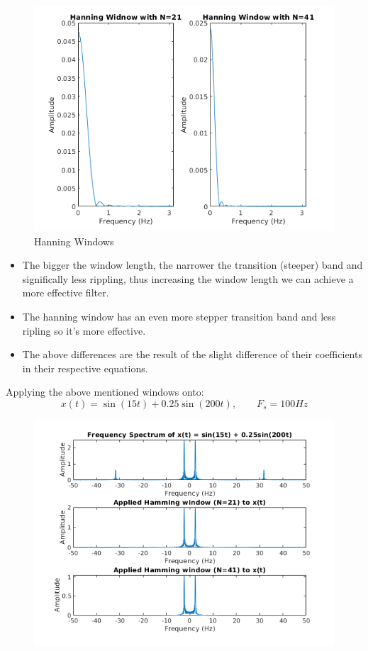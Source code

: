 \documentclass[12pt, a4paper]{article}
\begin{document}
\begin{enumerate}
\begin{figure}[H]
        \centering
        \includegraphics[scale=0.7]{hanning_wins.png}
        \caption{Hanning Windows}
    \end{figure}
    \begin{itemize}
        \item The bigger the window length, the narrower the transition (steeper) band and significally less rippling, 
        thus increasing the window length we can achieve a more effective filter.
        \item The hanning window has an even more stepper transition band and less ripling so it's more effective.
        \item The above differences are the result of the slight difference of their coefficients in their respective equations.
    \end{itemize}
    \pagebreak
    Applying the above mentioned windows onto:
    \[x(t) = \sin(15t) + 0.25\sin(200t),\qquad F_s = 100Hz\]
    \begin{figure}[H]
        \centering
        \includegraphics[scale=0.8]{hamm_sig.png}

\end{figure}
\end{enumerate}
\end{document}
